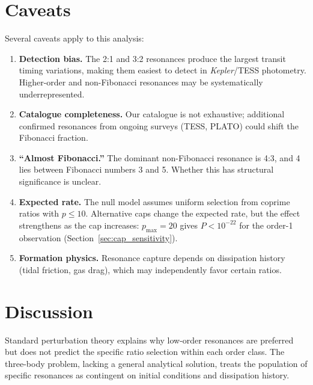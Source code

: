 \documentclass[twocolumn,11pt]{article}
\begin{document}
\section{Caveats}
\label{sec:caveats}

Several caveats apply to this analysis:

\begin{enumerate}
\item \textbf{Detection bias.}  The 2:1 and 3:2 resonances produce
the largest transit timing variations, making them easiest to detect
in \emph{Kepler}/TESS photometry.  Higher-order and non-Fibonacci
resonances may be systematically underrepresented.

\item \textbf{Catalogue completeness.}  Our catalogue is not
exhaustive; additional confirmed resonances from ongoing surveys
(TESS, PLATO) could shift the Fibonacci fraction.

\item \textbf{``Almost Fibonacci.''} The dominant non-Fibonacci
resonance is 4:3, and 4 lies between Fibonacci numbers 3 and 5.
Whether this has structural significance is unclear.

\item \textbf{Expected rate.}  The null model assumes uniform
selection from coprime ratios with $p \leq 10$.  Alternative caps
change the expected rate, but the effect strengthens as the cap
increases: $p_{\max} = 20$ gives $P < 10^{-22}$ for the
order-1 observation (Section~\ref{sec:cap_sensitivity}).

\item \textbf{Formation physics.}  Resonance capture depends on
dissipation history (tidal friction, gas drag), which may
independently favor certain ratios.
\end{enumerate}

\section{Discussion}
\label{sec:discussion}

Standard perturbation theory explains why low-order resonances are
preferred \citep{murray1999} but does not predict the specific ratio
selection within each order class.  The three-body problem, lacking a
general analytical solution, treats the population of specific
resonances as contingent on initial conditions and dissipation
history.
\end{document}
